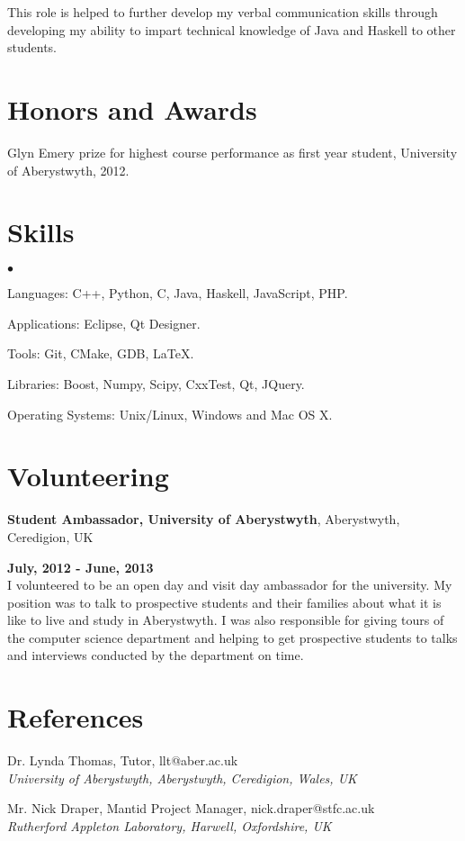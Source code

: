 \documentclass[margin,line]{res}
\newenvironment{list2}{
  \begin{list}{$\bullet$}{%
      \setlength{\itemsep}{0in}
      \setlength{\parsep}{0in} \setlength{\parskip}{0in}
      \setlength{\topsep}{0in} \setlength{\partopsep}{0in} 
      \setlength{\leftmargin}{0.2in}}}{\end{list}}
\begin{document}
\begin{resume}
This role is helped to further develop my verbal communication skills through developing my ability to impart technical knowledge of Java and Haskell to other students.

\section{\sc Honors and Awards} 
Glyn Emery prize for highest course performance as first year student, University of Aberystwyth, 2012.

\section{\sc Skills} 
\begin{list2}
\item Languages:  C++, Python, C, Java, Haskell, JavaScript, PHP.
\item Applications: Eclipse, Qt Designer.
\item Tools: Git, CMake, GDB, \LaTeX.
\item Libraries: Boost, Numpy, Scipy, CxxTest, Qt, JQuery.
\item Operating Systems:  Unix/Linux, Windows and Mac OS X.\\ 
\end{list2}

\section{\sc Volunteering} 
{\bf Student Ambassador, University of Aberystwyth}, Aberystwyth, Ceredigion, UK

\vspace{-.3cm}
\hfill {\bf July, 2012 - June, 2013}\\
I volunteered to be an open day and visit day ambassador for the university. My position was to talk to prospective students and their families about what it is like to live and study in Aberystwyth. I was also responsible for giving tours of the computer science department and helping to get prospective students to talks and interviews conducted by the department on time.

\section{\sc References}
Dr. Lynda Thomas, Tutor, llt@aber.ac.uk \\
{\em University of Aberystwyth, Aberystwyth, Ceredigion, Wales, UK}

Mr. Nick Draper, Mantid Project Manager, nick.draper@stfc.ac.uk \\	
{\em Rutherford Appleton Laboratory, Harwell, Oxfordshire, UK}

\end{resume}
\end{document}
